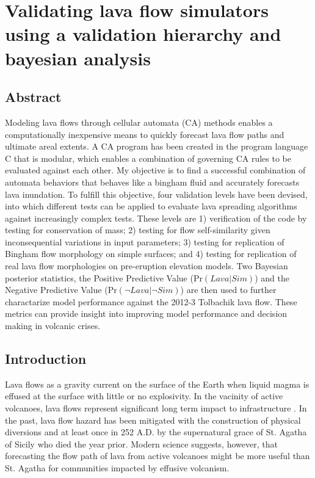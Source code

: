 \chapter[Validating lava flow simulators using a validation hierarchy and bayesian analysis]{Validating lava flow simulators using a validation hierarchy and bayesian analysis}\label{ch_molasses}


\renewcommand*{\FigPath}{figures/chapter-molasses}

\section*{Abstract}
	Modeling lava flows through cellular automata (CA) methods enables a computationally inexpensive means to quickly forecast lava flow paths and ultimate areal extents. A CA program has been created in the program language C that is modular, which enables a combination of governing CA rules to be evaluated against each other. My objective is to find a successful combination of automata behaviors that behaves like a bingham fluid and accurately forecasts lava inundation. To fulfill this objective, four validation levels have been devised, into which different tests can be applied to evaluate lava spreading algorithms against increasingly complex tests. These levels are 1) verification of the code by testing for conservation of mass; 2) testing for flow self-similarity given inconsequential variations in input parameters; 3) testing for replication of Bingham flow morphology on simple surfaces; and 4) testing for replication of real lava flow morphologies on pre-eruption elevation models. Two Bayesian posterior statistics, the Positive Predictive Value ($\text{Pr}(Lava|Sim)$) and the Negative Predictive Value ($\text{Pr}(\neg Lava|\neg Sim)$) are then used to further charactarize model performance against the 2012-3 Tolbachik lava flow. These metrics can provide insight into improving model performance and decision making in volcanic crises.

\section{Introduction}
	Lava flows as a gravity current on the surface of the Earth when liquid magma is effused at the surface with little or no explosivity. In the vacinity of active volcanoes, lava flows represent significant long term impact to infrastructure \citep{peterson2000lava}. In the past, lava flow hazard has been mitigated with the construction of physical diversions and at least once in 252 A.D. by the supernatural grace of St. Agatha of Sicily who died the year prior. Modern science suggests, however, that forecasting the flow path of lava from active volcanoes might be more useful than St. Agatha for communities impacted by effusive volcanism.


